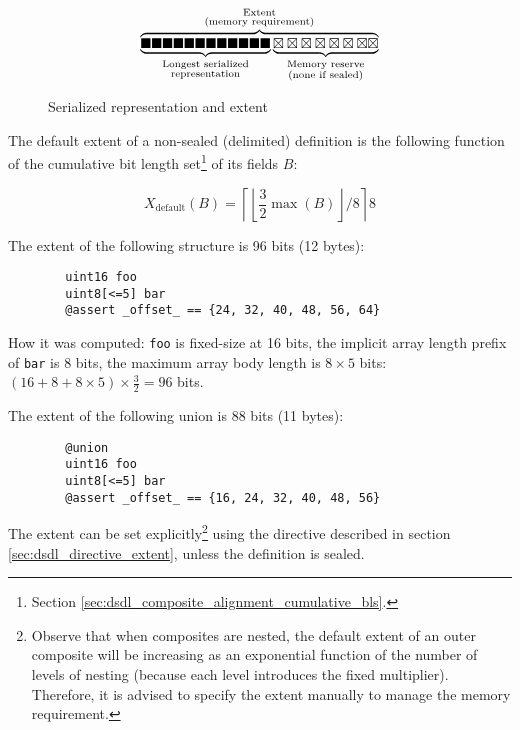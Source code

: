 \begin{figure}[H]
    $$
    \overbrace{%
        \underbrace{%
            \blacksquare\blacksquare\blacksquare\blacksquare\blacksquare\blacksquare%
            \blacksquare\blacksquare\blacksquare\blacksquare\blacksquare\blacksquare%
        }_{\substack{\text{Longest serialized} \\ \text{representation}}}%
        \underbrace{%
            \boxtimes\boxtimes\boxtimes\boxtimes\boxtimes\boxtimes\boxtimes\boxtimes%
        }_{\substack{\text{Memory reserve} \\ \text{(none if sealed)}}}%
    }^{\substack{%
        \text{Extent} \\
        \text{(memory requirement)}
    }}
    $$
    \caption{Serialized representation and extent\label{fig:dsdl_extent}}
\end{figure}

The default extent of a non-sealed (delimited) definition is the following function
of the cumulative bit length set\footnote{Section \ref{sec:dsdl_composite_alignment_cumulative_bls}.}
of its fields $B$:

$$
X_\text{default}\left(B\right) =
\left\lceil{}\left\lfloor{}\frac{3}{2} \max{}\left(B\right)\right\rfloor{}/8\right\rceil{}8
$$

\begin{remark}
    The extent of the following structure is 96 bits (12 bytes):
    \begin{verbatim}
        uint16 foo
        uint8[<=5] bar
        @assert _offset_ == {24, 32, 40, 48, 56, 64}
    \end{verbatim}
    How it was computed: \verb|foo| is fixed-size at 16 bits,
    the implicit array length prefix of \verb|bar| is 8 bits,
    the maximum array body length is $8 \times 5$ bits:
    $(16 + 8 + 8 \times 5) \times \frac{3}{2} = 96$ bits.

    The extent of the following union is 88 bits (11 bytes):
    \begin{verbatim}
        @union
        uint16 foo
        uint8[<=5] bar
        @assert _offset_ == {16, 24, 32, 40, 48, 56}
    \end{verbatim}
\end{remark}

The extent can be set explicitly\footnote{
    Observe that when composites are nested,
    the default extent of an outer composite will be increasing as an exponential
    function of the number of levels of nesting (because each level introduces the fixed multiplier).
    Therefore, it is advised to specify the extent manually to manage the memory requirement.
}
using the directive described in section \ref{sec:dsdl_directive_extent},
unless the definition is sealed.

